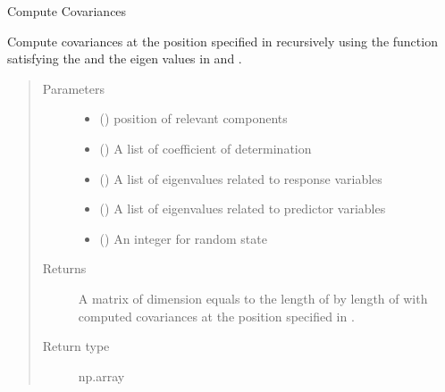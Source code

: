 \documentclass[letterpaper,10pt,english]{sphinxmanual}
\begin{document}
\begin{fulllineitems}
\label{\detokenize{Utilities:pysimrel.utilities.get_cov}}
Compute Covariances

Compute covariances at the position specified in  recursively using the
function  satisfying the  and the eigen values in  and .
\begin{quote}\begin{description}
\item[{Parameters}] \leavevmode\begin{itemize}
\item {} 
 () \textendash{} position of relevant components

\item {} 
 () \textendash{} A list of coefficient of determination

\item {} 
 () \textendash{} A list of eigenvalues related to response variables

\item {} 
 () \textendash{} A list of eigenvalues related to predictor variables

\item {} 
 () \textendash{} An integer for random state

\end{itemize}

\item[{Returns}] \leavevmode
A matrix of dimension equals to the length of  by length of  with     computed covariances at the position specified in .

\item[{Return type}] \leavevmode
np.array

\end{description}\end{quote}

\end{fulllineitems}
\end{document}

